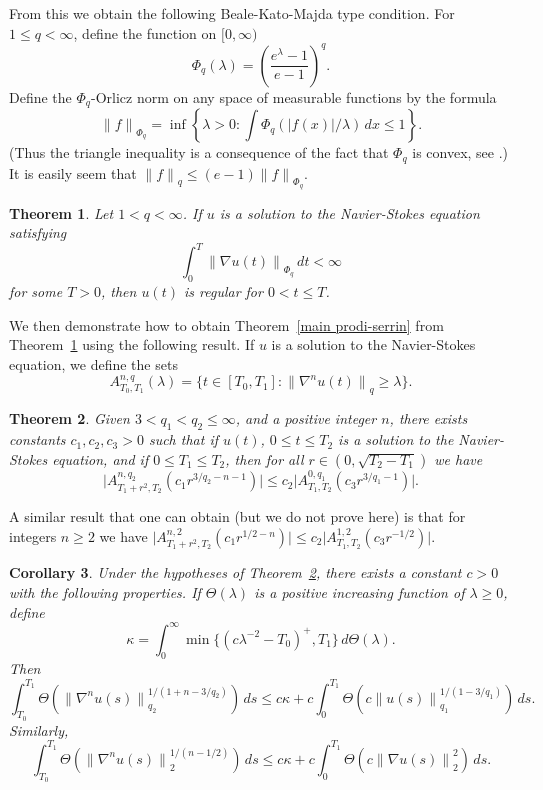 \documentclass[12pt]{amsart}
\newtheorem{thm}{Theorem}[section]
\newtheorem{cor}[thm]{Corollary}
\theoremstyle{remark}
\newcommand{\smodo}[1]{{\mathopen|#1\mathclose|}}
\newcommand{\snormo}[1]{{\mathopen\|#1\mathclose\|}}
\begin{document}
From this we obtain the following
Beale-Kato-Majda type condition.
For $ 1 \le q < \infty$, define the function on $[0,\infty)$
$$ \Phi_q(\lambda) = \left(\frac{e^\lambda-1}{e-1}\right)^q .$$
Define the
$\Phi_q$-Orlicz norm on
any space of measurable functions by the formula
$$ \snormo f_{\Phi_q} = 
   \inf\left\{\lambda>0:
   \int \Phi_q(\smodo{f(x)}/\lambda) \, dx \le 1 \right\} .$$
(Thus the triangle inequality is a consequence of the fact that
$\Phi_q$ is convex, see \cite{kras-rutickii}.)  
It is easily seem that 
$\snormo f_q \le (e-1) \snormo f_{\Phi_q}$.


\begin{thm} \label{main beale-kato-majda}
Let 
$1<q < \infty$.
If $u$ is a solution to the Navier-Stokes equation satisfying
$$ \int_0^T \snormo{\nabla u(t)}_{\Phi_q}
   \, dt < \infty $$
for some $T>0$, 
then $u(t)$ 
is regular for $0 < t\le T$.
\end{thm}

We then demonstrate how to obtain Theorem~\ref{main prodi-serrin}
from Theorem~\ref{main beale-kato-majda} using the following
result.  If $u$ is a solution to the Navier-Stokes equation, we define the
sets
$$ A^{n,q}_{T_0,T_1}(\lambda) =
   \{ t\in[T_0,T_1] :
   \snormo{\nabla^n u(t)}_q \ge \lambda \} .$$

\begin{thm} \label{main foias-guillope-temam}
Given $3 < q_1 < q_2 \le \infty$, and a positive integer $n$,
there exists
constants $c_1,c_2,c_3>0$ such that
if $u(t)$, $0 \le t \le T_2$ 
is a solution to the Navier-Stokes equation, and if $0\le T_1 \le T_2$,
then for all
$r \in (0,\sqrt{T_2-T_1})$ we have
$$ \smodo{A^{n,q_2}_{T_1+r^2,T_2}(c_1 r^{3/q_2-n-1})} 
   \le c_2 \smodo{A^{0,q_1}_{T_1,T_2}(c_3 r^{3/q_1-1})} .$$
\end{thm}

A similar result that one can obtain (but we do not prove here) is 
that for integers $n \ge 2$ we have
$ \smodo{A^{n,2}_{T_1+r^2,T_2}(c_1 r^{1/2-n})} 
   \le c_2 \smodo{A^{1,2}_{T_1,T_2}(c_3 r^{-1/2})} $.

\begin{cor} 
\label{cor foias-guillope-temam}
Under the hypotheses of Theorem~\ref{main foias-guillope-temam}, there
exists a constant $c>0$ with the following properties.
If
$\Theta(\lambda)$ is a positive increasing function of $\lambda\ge 0$,
define 
$$ \kappa = 
   \int_0^\infty \min\{(c\lambda^{-2}-T_0)^+,T_1\} \, d\Theta(\lambda) .$$
Then
$$
   \int_{T_0}^{T_1} \Theta(\snormo{\nabla^n u(s)}_{q_2}^{1/(1+n-3/q_2)}) \, ds
   \le 
   c \kappa + c \int_0^{T_1} \Theta(c\snormo{u(s)}_{q_1}^{1/(1-3/q_1)}) \, ds .
$$
Similarly,
$$
   \int_{T_0}^{T_1} \Theta(\snormo{\nabla^n u(s)}_2^{1/(n-1/2)}) \, ds
   \le 
   c \kappa + c \int_0^{T_1} \Theta(c\snormo{\nabla u(s)}_2^2) \, ds .
$$
\end{cor}
\end{document}
